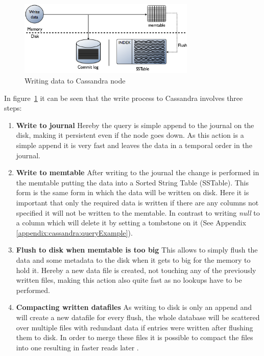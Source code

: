 \begin{figure}[ht]
    \centering
    \includegraphics[width=0.75\textwidth]{img/cassandra_local_write.png}
    \caption{Writing data to Cassandra node \autocite{datastaxWriteData}}
    \label{fig:cassandra:writeData}
\end{figure}
In figure~\ref{fig:cassandra:writeData} it can be seen that the write process to Cassandra involves three steps:
\begin{enumerate}
\item \textbf{Write to journal} Hereby the query is simple append to the journal on the disk, making it persistent even if the node goes down. As this action is a simple append it is very fast and leaves the data in a temporal order in the journal.
\item \textbf{Write to memtable} After writing to the journal the change is performed in the memtable putting the data into a Sorted String Table (SSTable). This form is the same form in which the data will be written on disk. Here it is important that only the required data is written if there are any columns not specified it will not be written to the memtable. In contrast to writing \textit{null} to a column which will delete it by setting a tombstone on it (See Appendix \ref{appendix:cassandra:queryExample}).
\item \textbf{Flush to disk when memtable is too big} This allows to simply flush the data and some metadata to the disk when it gets to big for the memory to hold it. Hereby a new data file is created, not touching any of the previously written files, making this action also quite fast as no lookups have to be performed.
\item \textbf{Compacting written datafiles} As writing to disk is only an append and will create a new datafile for every flush, the whole database will be scattered over multiple files with redundant data if entries were written after flushing them to disk. In order to merge these files it is possible to compact the files into one resulting in faster reads later \autocite{cassandraCompactTool}.
\end{enumerate}

